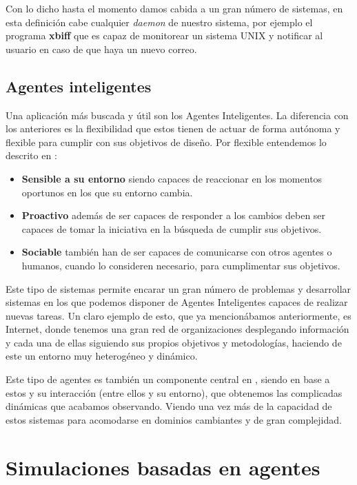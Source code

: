 Con lo dicho hasta el momento damos cabida a un gran número de sistemas, en esta definición cabe cualquier \textit{daemon} de nuestro sistema, por ejemplo el programa \textbf{xbiff} que es capaz de monitorear un sistema UNIX y notificar al usuario en caso de que haya un nuevo correo.

\subsection{Agentes inteligentes}

Una aplicación más buscada y útil son los Agentes Inteligentes. La diferencia con los anteriores es la flexibilidad que estos tienen de actuar de forma autónoma y flexible para cumplir con sus objetivos de diseño. Por flexible entendemos lo descrito en \cite{jennings1998agent}:

\begin{itemize}
	\item\textbf{Sensible a su entorno} siendo capaces de reaccionar en los momentos oportunos en los que su entorno cambia.
	\item\textbf{Proactivo} además de ser capaces de responder a los cambios deben ser capaces de tomar la iniciativa en la búsqueda de cumplir sus objetivos.
	\item\textbf{Sociable} también han de ser capaces de comunicarse con otros agentes o humanos, cuando lo consideren necesario, para cumplimentar sus objetivos.
\end{itemize}

Este tipo de sistemas permite encarar un gran número de problemas y desarrollar sistemas en los que podemos disponer de Agentes Inteligentes capaces de realizar nuevas tareas. Un claro ejemplo de esto, que ya mencionábamos anteriormente, es Internet, donde tenemos una gran red de organizaciones desplegando información y cada una de ellas siguiendo sus propios objetivos y metodologías, haciendo de este un entorno muy heterogéneo y dinámico.

Este tipo de agentes es también un componente central en \cite{park2023generative}, siendo en base a estos y su interacción (entre ellos y su entorno), que obtenemos las complicadas dinámicas que acabamos observando. Viendo una vez más de la capacidad de estos sistemas para acomodarse en dominios cambiantes y de gran complejidad.

\section{Simulaciones basadas en agentes}

